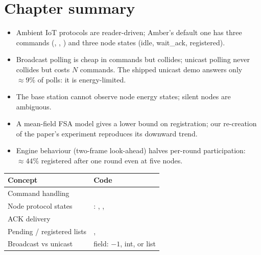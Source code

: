 \section{Chapter summary}
\begin{itemize}
 \item Ambient IoT protocols are reader-driven; Amber's default one has three commands (, , ) and three node states (idle, wait\_ack, registered).
 \item Broadcast polling is cheap in commands but collides; unicast polling never collides but costs $N$ commands. The shipped unicast demo answers only $\approx9\%$ of polls: it is energy-limited.
 \item The base station cannot observe node energy states; silent nodes are ambiguous.
 \item A mean-field FSA model gives a lower bound on registration; our re-creation of the paper's experiment reproduces its downward trend.
 \item Engine behaviour (two-frame look-ahead) halves per-round participation: $\approx44\%$ registered after one round even at five nodes.
\end{itemize}

\begin{codemap}
\small
\begin{tabularx}{\linewidth}{@{}>{\ttfamily}p{5.2cm}X@{}}
\toprule
\normalfont\bfseries Concept & \normalfont\bfseries Code\\
\midrule
Command handling & \codew{BackscatterModule.handle_command}\\
Node protocol states & \codew{BackscatterModule.state}: \code{idle}, \code{wait_ack}, \code{registered}\\
ACK delivery & \codew{BSBehavior._send_pending_acks}\\
Pending / registered lists & \codew{nodes_pending_ack}, \codew{nodes_registered}\\
Broadcast vs unicast & \code{target} field: $-1$, int, or list\\
\bottomrule
\end{tabularx}
\end{codemap}

